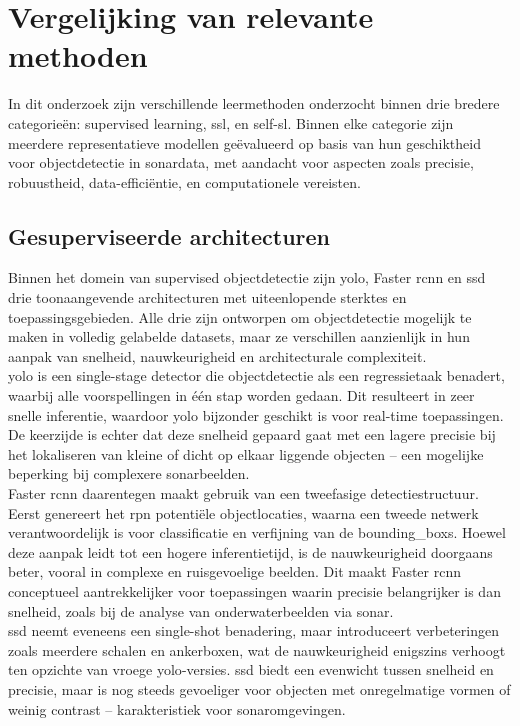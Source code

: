 \section{Vergelijking van relevante methoden}

In dit onderzoek zijn verschillende leermethoden onderzocht binnen drie bredere categorieën: supervised learning, \gls{ssl}, en \gls{self-sl}. Binnen elke categorie zijn meerdere representatieve modellen geëvalueerd op basis van hun geschiktheid voor objectdetectie in sonardata, met aandacht voor aspecten zoals precisie, robuustheid, data-efficiëntie, en computationele vereisten. 

\subsection{Gesuperviseerde architecturen}

Binnen het domein van supervised objectdetectie zijn \gls{yolo}, Faster \gls{rcnn} en \gls{ssd} drie toonaangevende architecturen met uiteenlopende sterktes en toepassingsgebieden. Alle drie zijn ontworpen om objectdetectie mogelijk te maken in volledig gelabelde datasets, maar ze verschillen aanzienlijk in hun aanpak van snelheid, nauwkeurigheid en architecturale complexiteit. \\

\gls{yolo} is een single-stage detector die objectdetectie als een regressietaak benadert, waarbij alle voorspellingen in één stap worden gedaan. Dit resulteert in zeer snelle inferentie, waardoor \gls{yolo} bijzonder geschikt is voor real-time toepassingen. De keerzijde is echter dat deze snelheid gepaard gaat met een lagere precisie bij het lokaliseren van kleine of dicht op elkaar liggende objecten -- een mogelijke beperking bij complexere sonarbeelden. \\

Faster \gls{rcnn} daarentegen maakt gebruik van een tweefasige detectiestructuur. Eerst genereert het \gls{rpn} potentiële objectlocaties, waarna een tweede netwerk verantwoordelijk is voor classificatie en verfijning van de \glspl{bounding_box}. Hoewel deze aanpak leidt tot een hogere inferentietijd, is de nauwkeurigheid doorgaans beter, vooral in complexe en ruisgevoelige beelden. Dit maakt Faster \gls{rcnn} conceptueel aantrekkelijker voor toepassingen waarin precisie belangrijker is dan snelheid, zoals bij de analyse van onderwaterbeelden via sonar. \\

\gls{ssd} neemt eveneens een single-shot benadering, maar introduceert verbeteringen zoals meerdere schalen en ankerboxen, wat de nauwkeurigheid enigszins verhoogt ten opzichte van vroege \gls{yolo}-versies. \gls{ssd} biedt een evenwicht tussen snelheid en precisie, maar is nog steeds gevoeliger voor objecten met onregelmatige vormen of weinig contrast -- karakteristiek voor sonaromgevingen.

